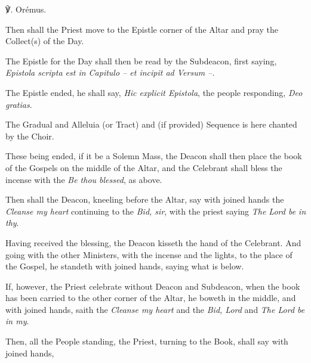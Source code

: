℣. Orémus.
\begin{rubric}
	Then shall the Priest move to the Epistle corner of the Altar and pray the Collect(s) of the Day.
\end{rubric}
\begin{rubric}
	The Epistle for the Day shall then be read by the Subdeacon, first saying, \emph{Epistola scripta est in Capitulo \emph{--} et incipit ad Versum \emph{--}.}
\end{rubric}
\begin{rubric}
	The Epistle ended, he shall say, \emph{Hic explicit Epistola}, the people responding, \emph{Deo gratias}.
\end{rubric}
\begin{rubric}
    The Gradual and Alleluia (or Tract) and (if provided) Sequence is here chanted by the Choir.
\end{rubric}
\begin{multicols}{2}
\begin{rubric}
    These being ended, if it be a Solemn Mass, the Deacon shall then place the book of the Gospels on the middle of the Altar, and the Celebrant shall bless the incense with the \emph{Be thou blessed}, as above.
\end{rubric}
\begin{rubric}
	Then shall the Deacon, kneeling before the Altar, say with joined hands the \emph{Cleanse my heart} continuing to the \emph{Bid, sir}, with the priest saying \emph{The Lord be in thy}.
\end{rubric}
\begin{rubric}
    Having received the blessing, the Deacon kisseth the hand of the Celebrant. And going with the other Ministers, with the incense and the lights, to the place of the Gospel, he standeth with joined hands, saying what is below.
\end{rubric}
\begin{rubric}
    If, however, the Priest celebrate without Deacon and Subdeacon, when the book has been carried to the other corner of the Altar, he boweth in the middle, and with joined hands, saith the \emph{Cleanse my heart} and the \emph{Bid, Lord} and \emph{The Lord be in my}.
\end{rubric}
\end{multicols}
\begin{rubric}
	Then, all the People standing, the Priest, turning to the Book, shall say with joined hands,
\end{rubric}

